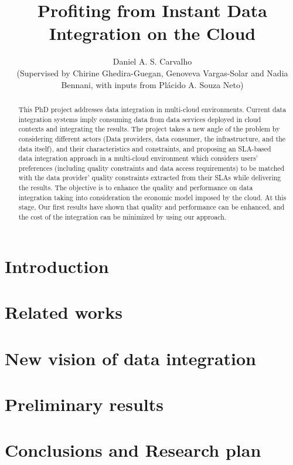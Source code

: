\documentclass{llncs}
\theoremstyle{plain}
\theoremstyle{plain}
\theoremstyle{plain}
\theoremstyle{plain}
\begin{document}
 

\title{Profiting from Instant Data Integration on the Cloud}
\author{Daniel A. S. Carvalho \\ (Supervised by Chirine Ghedira-Guegan, Genoveva Vargas-Solar and
	   Nadia Bennani, with inputs from Pl\'acido A. Souza Neto)}
 

\maketitle

  
\begin{abstract}
This PhD project addresses data integration in multi-cloud environments. Current data integration systems imply consuming data from data services deployed in cloud contexts and integrating the results.
The project takes a new angle of the problem by considering different actors (Data providers, data consumer, the infrastructure, and the data itself), and their characteristics and constraints, and proposing an SLA-based data integration approach in a multi-cloud environment which considers users' preferences (including quality constraints and data access requirements) to be matched with the data provider' quality constraints extracted from their SLAs while delivering the results. 
The objective is to enhance the quality and performance on data integration taking into consideration the economic model imposed by the cloud. At this stage, Our first results have shown that quality and performance can be enhanced, and the cost of the integration can be minimized by using our approach. 
\end{abstract}
 
 

\section{Introduction}


\section{Related works}


\section{New vision of data integration}


\section{Preliminary results}


\section{Conclusions and Research plan}


 
 

\end{document}
